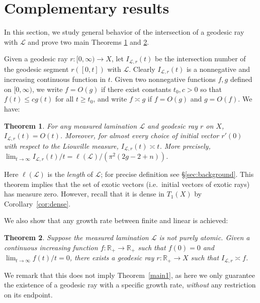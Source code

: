 \documentclass[11pt]{article} %
\theoremstyle{plain}
\newtheorem{thm}{Theorem}[section]
\theoremstyle{definition}
\numberwithin{equation}{section}
\begin{document}
\section{Complementary results}\label{sec:complementary}
In this section, we study general behavior of the intersection of a geodesic ray with $\mathcal{L}$ and prove two main Theorems \ref{thm:linear} and \ref{sublinear}.

Given a geodesic ray $r:[0,\infty)\to X$, let $I_{\mathcal{L},r}(t)$ be the intersection number of the geodesic segment $r([0,t])$ with $\mathcal{L}$. Clearly $I_{\mathcal{L},r}(t)$ is a nonnegative and increasing continuous function in $t$. Given two nonnegative functions $f,g$ defined on $[0,\infty)$, we write $f=O(g)$ if there exist constants $t_0,c>0$ so that $f(t)\le cg(t)$ for all $t\ge t_0$, and write $f\asymp g$ if $f=O(g)$ and $g=O(f)$. We have:
\begin{thm}\label{thm:linear}
For any measured lamination $\mathcal{L}$ and geodesic ray $r$ on $X$, $I_{\mathcal{L},r}(t)=O(t)$. Moreover, for almost every choice of initial vector $r'(0)$ with respect to the Liouville measure, $I_{\mathcal{L},r}(t)\asymp t$. More precisely, $\lim_{t \rightarrow \infty} I_{\mathcal{L},r}(t)/{t}= \ell(\mathcal{L})/(\pi^2(2g-2+n))$. 
\end{thm}
Here $\ell(\mathcal{L})$ is the \emph{length} of $\mathcal{L}$; for precise definition see \S \ref{sec:background}. This theorem implies that the set of exotic vectors (i.e.\ initial vectors of exotic rays) has measure zero. However, recall that it is dense in $T_1(X)$ by Corollary~\ref{cor:dense}.

We also show that any growth rate between finite and linear is achieved:
\begin{thm}\label{sublinear}
Suppose the measured lamination $\mathcal{L}$ is not purely atomic. Given a continuous increasing function $f:\mathbb{R}_+\to\mathbb{R}_+$ such that $f(0)=0$ and $\lim_{t\to\infty}f(t)/t=0$, there exists a geodesic ray $r:\mathbb{R}_+\to X$ such that $I_{\mathcal{L},r}\asymp f$.
\end{thm}
We remark that this does not imply Theorem~\ref{main1}, as here we only guarantee the existence of a geodesic ray with a specific growth rate, \emph{without} any restriction on its endpoint.

\end{document}

